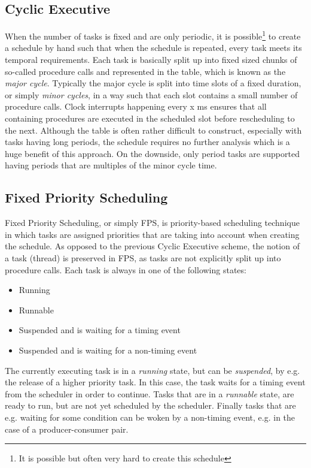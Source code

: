 \subsection{Cyclic Executive}
When the number of tasks is fixed and are only periodic, it is possible\footnote{It is possible but often very hard to create this schedule} to create a schedule by hand such that when the schedule is repeated, every task meets its temporal requirements. Each task is basically split up into fixed sized chunks of so-called procedure calls and represented in the table, which is known as the \textit{major cycle}. Typically the major cycle is split into time slots of a fixed duration, or simply \textit{minor cycles}, in a way such that each slot contains a small number of procedure calls. Clock interrupts happening every x ms ensures that all containing procedures are executed in the scheduled slot before rescheduling to the next. Although the table is often rather difficult to construct, especially with tasks having long periods, the schedule requires no further analysis which is a huge benefit of this approach. On the downside, only period tasks are supported having periods that are multiples of the minor cycle time.

\subsection{Fixed Priority Scheduling}
Fixed Priority Scheduling, or simply FPS, is priority-based scheduling technique in which tasks are assigned priorities that are taking into account when creating the schedule. As opposed to the previous Cyclic Executive scheme, the notion of a task (thread) is preserved in FPS, as tasks are not explicitly split up into procedure calls. Each task is always in one of the following states:

\begin{itemize}
	\item Running
	\item Runnable
	\item Suspended and is waiting for a timing event
	\item Suspended and is waiting for a non-timing event
\end{itemize}

The currently executing task is in a \textit{running} state, but can be \textit{suspended}, by e.g. the release of a higher priority task. In this case, the task waits for a timing event from the scheduler in order to continue. Tasks that are in a \textit{runnable} state, are ready to run, but are not yet scheduled by the scheduler. Finally tasks that are e.g. waiting for some condition can be woken by a non-timing event, e.g. in the case of a producer-consumer pair. 

